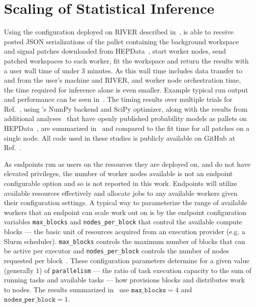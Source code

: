 \section{Scaling of Statistical Inference}\label{sec:results}
%
Using the \funcX{} configuration deployed on RIVER described in~, \funcX{} is able to receive posted JSON serializations of the \pyhf{} pallet containing the background workspace and signal patches downloaded from HEPData~\cite{ATLAS_SUSY_1Lbb_pallet}, start \funcX{} worker nodes, send patched workspaces to each worker, fit the workspace and return the results with a user wall time of under 3 minutes.
As this wall time includes data transfer to and from the user's machine and RIVER, and worker node orchestration time, the time required for inference alone is even smaller.
Example typical run output and performance can be seen in~.
The timing results over multiple trials for Ref.~\cite{ATLAS_SUSY_1Lbb_pallet}, using \pyhf{}'s NumPy backend and SciPy optimizer, along with the results from additional analyses~\cite{SUSY-2018-09,SUSY-2018-04} that have openly published probability models as \pyhf{} pallets on HEPData~\cite{ATLAS_SUSY_SS3L_pallet,ATLAS_SUSY_staus_pallet}, are summarized in~ and compared to the fit time for all patches on a single node.
All code used in these studies is publicly available on GitHub at Ref.~\cite{study_code}.

As \funcX{} endpoints run as users on the resources they are deployed on, and do not have elevated privileges, the number of worker nodes available is not an endpoint configurable option and so is not reported in this work.
Endpoints will utilize available resources effectively and allocate jobs to any available workers given their configuration settings.
A typical way to parameterize the range of available workers that an endpoint can scale work out on is by the \funcX{} endpoint configuration variables \texttt{max\_blocks} and \texttt{nodes\_per\_block} that control the available compute blocks --- the basic unit of resources acquired from an execution provider (e.g. a Slurm scheduler).
\texttt{max\_blocks} controls the maximum number of blocks that can be active per \funcX{} executor and \texttt{nodes\_per\_block} controls the number of nodes requested per block~\cite{Parsl_paper}.
These configuration parameters determine for a given value (generally $1$) of \texttt{parallelism} --- the ratio of task execution capacity to the sum of running tasks and available tasks --- how \funcX{} provisions blocks and distributes work to nodes.
The results summarized in~ use $\texttt{max\_blocks}=4$ and $\texttt{nodes\_per\_block}=1$.

